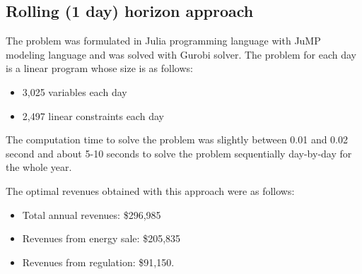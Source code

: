 \documentclass[11pt,twoside]{article}
\begin{document}
\subsection{Rolling (1 day) horizon approach}
The problem was formulated in Julia programming language with JuMP modeling language and was solved with Gurobi solver. The problem for each day is a linear program whose size is as follows:
\begin{itemize}
\item 3,025 variables each day
\item 2,497 linear constraints each day
\end{itemize}
The computation time to solve the problem was slightly between 0.01 and 0.02 second and about 5-10 seconds to solve the problem sequentially day-by-day for the whole year.

The optimal revenues obtained with this approach were as follows:
\begin{itemize}
\item Total annual revenues: \$296,985
\item Revenues from energy sale: \$205,835
\item Revenues from regulation: \$91,150.
\end{itemize}
\end{document}
